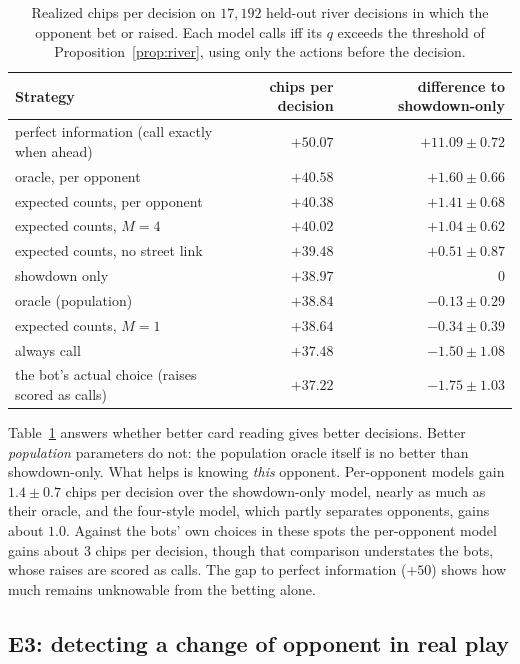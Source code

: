 \documentclass[11pt,a4paper]{article}
\newcommand{\1}{\mathbf{1}}
\begin{document}
\begin{table}[t]
\centering\small
\begin{tabular}{@{}lrr@{}}
\toprule
Strategy & chips per decision & difference to showdown-only\\
\midrule
perfect information (call exactly when ahead) & $+50.07$ & $+11.09\pm0.72$\\
oracle, per opponent & $+40.58$ & $+1.60\pm0.66$\\
expected counts, per opponent & $+40.38$ & $+1.41\pm0.68$\\
expected counts, $M=4$ & $+40.02$ & $+1.04\pm0.62$\\
expected counts, no street link & $+39.48$ & $+0.51\pm0.87$\\
showdown only & $+38.97$ & $0$\\
oracle (population) & $+38.84$ & $-0.13\pm0.29$\\
expected counts, $M=1$ & $+38.64$ & $-0.34\pm0.39$\\
always call & $+37.48$ & $-1.50\pm1.08$\\
the bot's actual choice (raises scored as calls) & $+37.22$ & $-1.75\pm1.03$\\
\bottomrule
\end{tabular}
\caption{Realized chips per decision on $17{,}192$ held-out river decisions in
which the opponent bet or raised. Each model calls iff its $q$ exceeds the
threshold of Proposition~\ref{prop:river}, using only the actions before the
decision.}
\label{tab:decisions}
\end{table}

Table~\ref{tab:decisions} answers whether better card reading gives better
decisions. Better \emph{population} parameters do not: the population oracle
itself is no better than showdown-only. What helps is knowing \emph{this}
opponent. Per-opponent models gain $1.4\pm0.7$ chips per decision over the
showdown-only model, nearly as much as their oracle, and the four-style model,
which partly separates opponents, gains about $1.0$. Against the bots' own
choices in these spots the per-opponent model gains about $3$ chips per
decision, though that comparison understates the bots, whose raises are scored
as calls. The gap to perfect information ($+50$) shows how much remains
unknowable from the betting alone.

\subsection{E3: detecting a change of opponent in real play}
\end{document}
